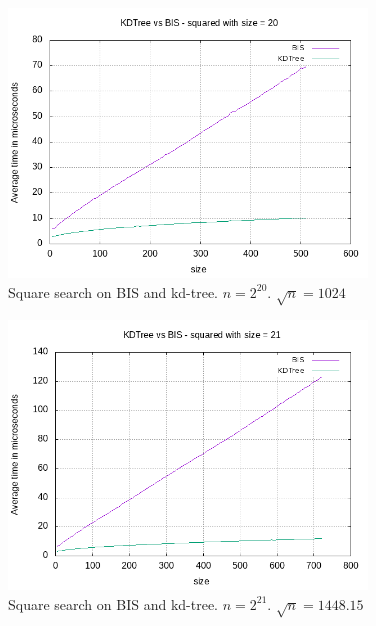 \begin{figure}[h]
    \centering
    \includegraphics[width = 0.85\textwidth]{pictures/analysis/sqrt_20.png}
    \caption{Square search on BIS and kd-tree. $n=2^{20}$. $\sqrt{n} = 1024$}\label{fig:sqrt_20}
\end{figure}

\begin{figure}[h]
    \centering
    \includegraphics[width = 0.85\textwidth]{pictures/analysis/sqrt_21.png}
    \caption{Square search on BIS and kd-tree. $n=2^{21}$. $\sqrt{n} = 1448.15$}\label{fig:sqrt_21}
\end{figure}

